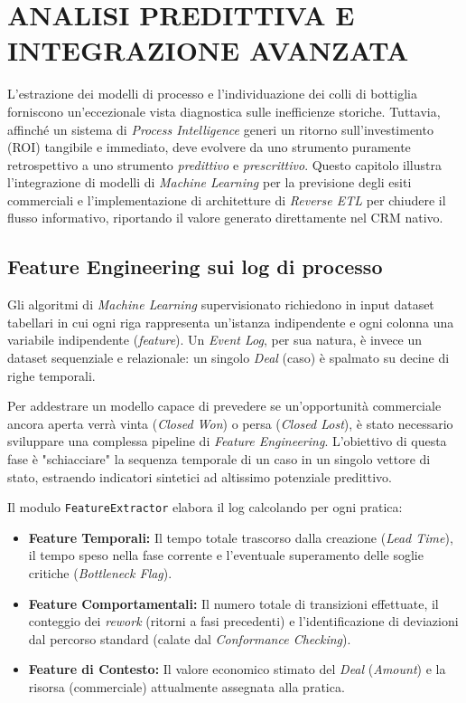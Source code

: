\documentclass[12pt, a4paper]{report}
\begin{document}
\chapter{ANALISI PREDITTIVA E INTEGRAZIONE AVANZATA}

L'estrazione dei modelli di processo e l'individuazione dei colli di bottiglia forniscono un'eccezionale vista diagnostica sulle inefficienze storiche. Tuttavia, affinché un sistema di \textit{Process Intelligence} generi un ritorno sull'investimento (ROI) tangibile e immediato, deve evolvere da uno strumento puramente retrospettivo a uno strumento \textit{predittivo} e \textit{prescrittivo}. Questo capitolo illustra l'integrazione di modelli di \textit{Machine Learning} per la previsione degli esiti commerciali e l'implementazione di architetture di \textit{Reverse ETL} per chiudere il flusso informativo, riportando il valore generato direttamente nel CRM nativo.

\section{Feature Engineering sui log di processo}
Gli algoritmi di \textit{Machine Learning} supervisionato richiedono in input dataset tabellari in cui ogni riga rappresenta un'istanza indipendente e ogni colonna una variabile indipendente (\textit{feature}). Un \textit{Event Log}, per sua natura, è invece un dataset sequenziale e relazionale: un singolo \textit{Deal} (caso) è spalmato su decine di righe temporali.

Per addestrare un modello capace di prevedere se un'opportunità commerciale ancora aperta verrà vinta (\textit{Closed Won}) o persa (\textit{Closed Lost}), è stato necessario sviluppare una complessa pipeline di \textit{Feature Engineering}. L'obiettivo di questa fase è "schiacciare" la sequenza temporale di un caso in un singolo vettore di stato, estraendo indicatori sintetici ad altissimo potenziale predittivo.

Il modulo \texttt{FeatureExtractor} elabora il log calcolando per ogni pratica:
\begin{itemize}
    \item \textbf{Feature Temporali:} Il tempo totale trascorso dalla creazione (\textit{Lead Time}), il tempo speso nella fase corrente e l'eventuale superamento delle soglie critiche (\textit{Bottleneck Flag}).
    \item \textbf{Feature Comportamentali:} Il numero totale di transizioni effettuate, il conteggio dei \textit{rework} (ritorni a fasi precedenti) e l'identificazione di deviazioni dal percorso standard (calate dal \textit{Conformance Checking}).
    \item \textbf{Feature di Contesto:} Il valore economico stimato del \textit{Deal} (\textit{Amount}) e la risorsa (commerciale) attualmente assegnata alla pratica.
\end{itemize}
\end{document}
